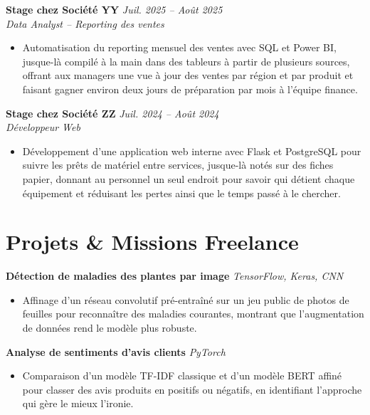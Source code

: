 \documentclass[11pt,a4paper]{extarticle}
\let\oldtextbf\textbf
\renewcommand{\textbf}[1]{\textcolor{primary}{\oldtextbf{#1}}}
\begin{document}
\vspace{1pt}

\textbf{Stage chez Société YY} \hfill \textit{Juil. 2025 -- Août 2025} \\
\textit{Data Analyst – Reporting des ventes}
\begin{itemize}
\item Automatisation du reporting mensuel des ventes avec SQL et Power BI, jusque-là compilé à la main dans des tableurs à partir de plusieurs sources, offrant aux managers une vue à jour des ventes par région et par produit et faisant gagner environ deux jours de préparation par mois à l'équipe finance.
\end{itemize}

\vspace{1pt}

\textbf{Stage chez Société ZZ} \hfill \textit{Juil. 2024 -- Août 2024} \\
\textit{Développeur Web}
\begin{itemize}
\item Développement d'une application web interne avec Flask et PostgreSQL pour suivre les prêts de matériel entre services, jusque-là notés sur des fiches papier, donnant au personnel un seul endroit pour savoir qui détient chaque équipement et réduisant les pertes ainsi que le temps passé à le chercher.
\end{itemize}

\section*{Projets \& Missions Freelance}

\textbf{Détection de maladies des plantes par image} \hfill \textit{TensorFlow, Keras, CNN}
\begin{itemize}
\item Affinage d'un réseau convolutif pré-entraîné sur un jeu public de photos de feuilles pour reconnaître des maladies courantes, montrant que l'augmentation de données rend le modèle plus robuste.
\end{itemize}

\vspace{1pt}

\textbf{Analyse de sentiments d'avis clients} \hfill \textit{PyTorch}
\begin{itemize}
\item Comparaison d'un modèle TF-IDF classique et d'un modèle BERT affiné pour classer des avis produits en positifs ou négatifs, en identifiant l'approche qui gère le mieux l'ironie.
\end{itemize}
\end{document}
